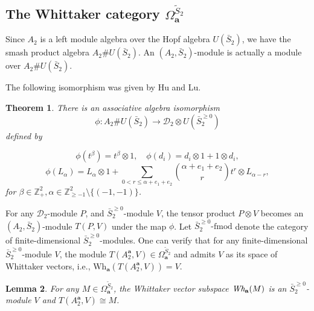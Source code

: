 \documentclass[12pt,a4paper]{amsart}
\newtheorem{Theorem}{Theorem}[section]
\newtheorem{Lemma}[Theorem]{Lemma}
\def\Z{\mathbb{Z}}
\def\ba{\mathbf{a}}
\def\a{\alpha}
\def\be{\beta}
\begin{document}
\subsection{The Whittaker category $\Omega^{\widetilde{S}_2}_{\ba}$}
Since  $A_2$ is a left  module algebra over the Hopf algebra $U(\bar{S}_2)$, we have the smash product algebra $A_2\# U(\bar{S}_2)$. An $(A_2,\bar{S}_2)$-module is actually a module
over $A_2\# U(\bar{S}_2)$.

The following isomorphism was given by Hu and Lu.

\begin{Theorem}\label{AS-iso}\emph{\cite{HL1}}
There is an associative algebra isomorphism
$$\phi:A_2\# U(\bar{S}_2)\rightarrow \mathcal{D}_2\otimes U(\bar{S}_2^{\geq 0})$$ defined by

$$\phi(t^{\be})=t^{\be}\otimes 1,\quad \phi(d_i)=d_i\otimes 1+1\otimes d_i,$$
$$\phi(L_{\alpha})=L_{\alpha}\otimes 1+ \sum_{0<r \leq \alpha+e_1+e_2} \binom{\alpha+e_1+e_2}{r}t^{r}\otimes L_{\alpha-r},$$
for $\be\in\Z_+^2,\a\in \mathbb{Z}^2_{\geq-1}\setminus\{(-1,-1)\}$.
\end{Theorem}

For any $\mathcal{D}_2$-module $P$, and $\bar{S}_2 ^{\geq 0}$-module $V$, the tensor product $P\otimes V$ becomes an $(A_2,\bar{S}_2)$-module $T(P,V)$ under the map
$\phi$. Let $\bar{S}_2 ^{\geq 0}\text{-fmod}$ denote the category of finite-dimensional $\bar{S}_2 ^{\geq 0}$-modules.
One can verify that for any finite-dimensional $\bar{S}_2 ^{\geq 0}$-module $V$, the module $T(A_2^{\ba}, V)\in\Omega_{\ba}^{\widetilde{S}_2}$
and admits $V$ as its space of Whittaker vectors, i.e., $\text{Wh}_{\mathbf{a}}(T(A_2^{\ba}, V)) = V$.


\begin{Lemma}\label{T-M}
For any $M\in \Omega^{\widetilde{S}_2}_{\ba}$, the Whittaker vector subspace $\emph{Wh}_{\ba}(M)$ is an $\bar{S}_2 ^{\geq 0}$-module $V$ and $T(A^{\ba}_2,V) \cong M$.
\end{Lemma}
\end{document}
